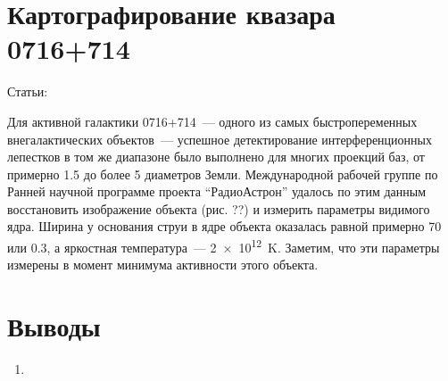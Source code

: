 \section{Картографирование квазара 0716+714}

Статьи: \cite{Kardashev_2013_rus}

Для активной галактики 0716+714~--- одного из самых быстропеременных внегалактических объектов~---
успешное детектирование интерференционных лепестков в том же диапазоне было выполнено для многих
проекций баз, от примерно 1.5 до более 5 диаметров Земли. Международной рабочей группе по Ранней
научной программе проекта ``РадиоАстрон'' удалось по этим данным восстановить изображение объекта
(рис. ??) и измерить параметры видимого ядра. Ширина у основания струи в ядре объекта оказалась
равной примерно \SI{70}{\uas} или \SI{0.3}{\parsec}, а яркостная температура~--- \SI{2e12}{\kelvin}.
Заметим, что эти параметры измерены в момент минимума активности этого объекта.

\section{Выводы}

\begin{enumerate}
 \item
\end{enumerate}


